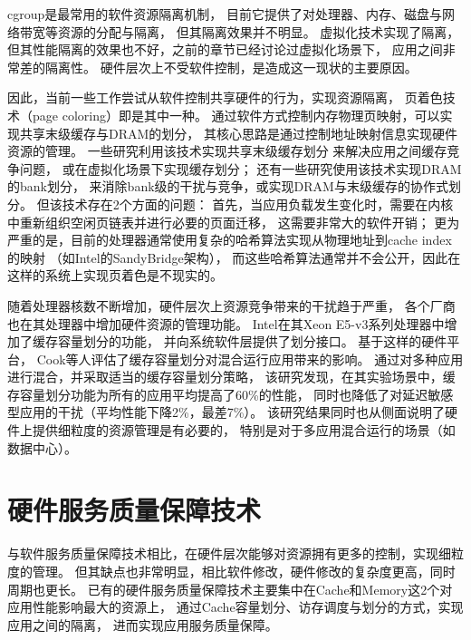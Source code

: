 cgroup\cite{cgroup}是最常用的软件资源隔离机制，
目前它提供了对处理器、内存、磁盘与网络带宽等资源的分配与隔离，
但其隔离效果并不明显。
虚拟化技术实现了隔离，但其性能隔离的效果也不好，之前的章节已经讨论过虚拟化场景下，
应用之间非常差的隔离性。
硬件层次上不受软件控制，是造成这一现状的主要原因。

因此，当前一些工作尝试从软件控制共享硬件的行为，实现资源隔离，
页着色技术（page coloring）即是其中一种。
通过软件方式控制内存物理页映射，可以实现共享末级缓存与DRAM的划分，
其核心思路是通过控制地址映射信息实现硬件资源的管理。
一些研究利用该技术实现共享末级缓存划分\cite{lin_gaining_2008, tam_managing_2007}
来解决应用之间缓存竞争问题，
或在虚拟化场景下实现缓存划分\cite{Jin2009, Chen2010, Wang2012}；
还有一些研究\cite{liu_software_2012}使用该技术实现DRAM的bank划分，
来消除bank级的干扰与竞争，或实现DRAM与末级缓存的协作式划分\cite{Liu:2014:ISCA}。
但该技术存在2个方面的问题：
首先，当应用负载发生变化时，需要在内核中重新组织空闲页链表并进行必要的页面迁移，
这需要非常大的软件开销；
更为严重的是，目前的处理器通常使用复杂的哈希算法实现从物理地址到cache index的映射
（如Intel的SandyBridge架构），
而这些哈希算法通常并不会公开，因此在这样的系统上实现页着色是不现实的。

随着处理器核数不断增加，硬件层次上资源竞争带来的干扰趋于严重，
各个厂商也在其处理器中增加硬件资源的管理功能。
Intel在其Xeon E5-v3系列处理器中增加了缓存容量划分的功能，
并向系统软件层提供了划分接口。
基于这样的硬件平台，
Cook等人\cite{cook_hardware_2013}评估了缓存容量划分对混合运行应用带来的影响。
通过对多种应用进行混合，并采取适当的缓存容量划分策略，
该研究发现，在其实验场景中，缓存容量划分功能为所有的应用平均提高了60\%的性能，
同时也降低了对延迟敏感型应用的干扰（平均性能下降2\%，最差7\%）。
该研究结果同时也从侧面说明了硬件上提供细粒度的资源管理是有必要的，
特别是对于多应用混合运行的场景（如数据中心）。



\section{硬件服务质量保障技术}

与软件服务质量保障技术相比，在硬件层次能够对资源拥有更多的控制，实现细粒度的管理。
但其缺点也非常明显，相比软件修改，硬件修改的复杂度更高，同时周期也更长。
已有的硬件服务质量保障技术主要集中在Cache和Memory这2个对应用性能影响最大的资源上，
通过Cache容量划分、访存调度与划分的方式，实现应用之间的隔离，
进而实现应用服务质量保障。

